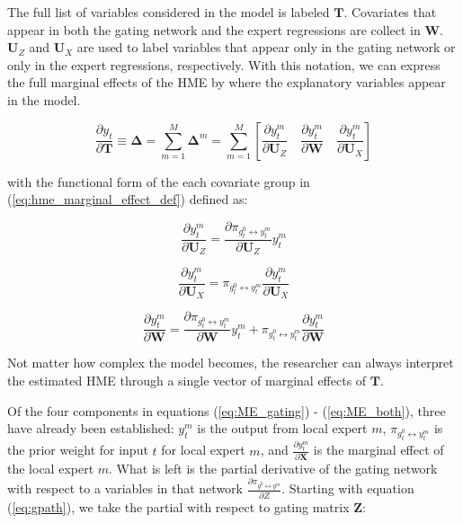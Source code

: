\documentclass[12pt]{article}
\newcommand{\gateprod}[2]{\pi_{#1 \longleftrightarrow #2}}
\begin{document}
The full list of variables considered in the model is labeled $\boldsymbol{T}$.
Covariates that appear in both the gating network and the expert regressions
are collect in $\boldsymbol{W}$. $\boldsymbol{U}_{Z}$ and $\boldsymbol{U}_{X}$ are
used to label variables that appear only in the gating network or only in the expert
regressions, respectively. With this notation, we can express the full marginal effects
of the HME by where the explanatory variables appear in the model.

\begin{equation} \label{eq:hme_marginal_effect_def}
  \frac{\partial y_{t}}{\partial \boldsymbol{T}} \equiv \boldsymbol{\Delta} = \sum_{m=1}^{M} \boldsymbol{\Delta}^{m} = \sum_{m=1}^{M} \left[ \frac{\partial y^{m}_{t}}{\partial \boldsymbol{U}_{Z}}   \quad   \frac{\partial y^{m}_{t}}{\partial \boldsymbol{W}}   \quad   \frac{\partial y^{m}_{t}}{\partial \boldsymbol{U}_{X}}   \right]
\end{equation}

with the functional form of the each covariate group in (\ref{eq:hme_marginal_effect_def})
defined as:


\begin{equation} \label{eq:ME_gating}
  \frac{\partial y_{t}^{m}}{\partial \boldsymbol{U}_{Z}} = \frac{\partial \gateprod{g^{0}_{t}}{y^{m}_{t}}}{{\partial \boldsymbol{U}_{Z}}} y^{m}_{t}
\end{equation}


\begin{equation} \label{eq:ME_expert}
  \frac{\partial y_{t}^{m}}{\partial \boldsymbol{U}_{X}} = \gateprod{g^{0}_{t}}{y^{m}_{t}} \frac{\partial y^{m}_{t}}{{\partial \boldsymbol{U}_{X}}}
\end{equation}


\begin{equation} \label{eq:ME_both}
  \frac{\partial y_{t}^{m}}{\partial \boldsymbol{W}} = \frac{\partial \gateprod{g^{0}_{t}}{y^{m}_{t}}}{{\partial \boldsymbol{W}}} y^{m}_{t} + \gateprod{g^{0}_{t}}{y^{m}_{t}} \frac{\partial y^{m}_{t}}{{\partial \boldsymbol{W}}}
\end{equation}

Not matter how complex the model becomes, the researcher can always interpret
the estimated HME through a single vector of marginal effects of $\boldsymbol{T}$.

Of the four components in equations (\ref{eq:ME_gating}) - (\ref{eq:ME_both}),
three have already been established: $y_{t}^{m}$ is the output from local
expert $m$, $\gateprod{g^{0}_{t}}{y^{m}_{t}}$ is the prior weight for
input $t$ for local expert $m$, and $\frac{\partial y^{m}_{t}}{{\partial \boldsymbol{X}}}$
is the marginal effect of the local expert $m$. What is left is the
partial derivative of the gating network with respect to a variables
in that network $\frac{\partial \gateprod{g^{0}}{y^{m}}}{\partial Z}$.
Starting with equation (\ref{eq:gpath}), we take the partial with
respect to gating matrix $\boldsymbol{Z}$:
\end{document}
